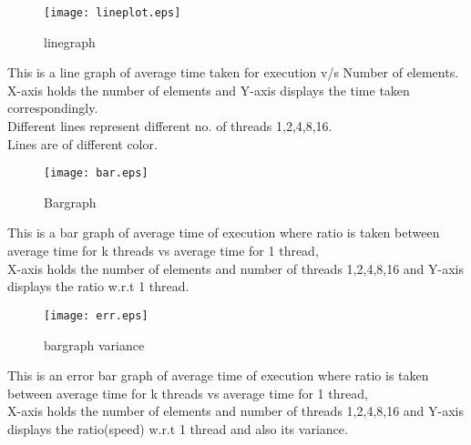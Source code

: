 \documentclass{article}
\begin{document}
\begin{figure}
\texttt{[image: lineplot.eps]}
\caption{linegraph}
\label{fig:Line graph}
\end{figure}
\noindent
This is a line graph of average time taken for execution v/s Number of
elements. \\
X-axis holds the number of elements and
Y-axis displays the time taken correspondingly. \\
Different lines represent different no. of threads {1,2,4,8,16}.\\
Lines are of different color.
\clearpage

\begin{figure}
\texttt{[image: bar.eps]}
\caption{Bargraph}
\label{fig:Average Speedup graph}
\end{figure}
\noindent
This is a bar graph of average time of execution where ratio is taken between average time for k threads vs average time for 1 thread, \\
X-axis holds the number of elements and number of threads {1,2,4,8,16} and Y-axis displays the ratio w.r.t 1
thread.\\

\clearpage

\begin{figure}
\texttt{[image: err.eps]}
\caption{bargraph variance}
\label{fig:Error graph}
\end{figure}
\noindent
This is an error bar graph of average time of execution where ratio is taken between average time for k threads vs average time for 1 thread, \\
X-axis holds the number of elements and number of threads {1,2,4,8,16} and Y-axis displays the ratio(speed)
w.r.t 1 thread and also its variance.
\end{document}
